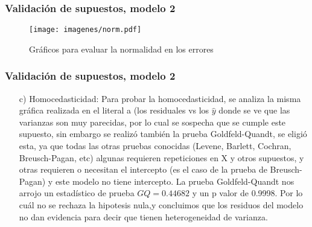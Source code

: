 \documentclass[12pt]{beamer}
\begin{document}
\begin{frame}
\frametitle{Validación de supuestos, modelo 2}
\begin{figure}[h]
  \centering
  \texttt{[image: imagenes/norm.pdf]}
  \caption{Gráficos para evaluar la normalidad en los errores}\label{figura1}
\end{figure}
\end{frame}

\begin{frame}
\frametitle{Validación de supuestos, modelo 2}
\begin{itemize}
\item[c)] Homocedasticidad: Para probar la homocedasticidad, se analiza la misma gráfica realizada en el literal a (los residuales vs los $\hat{y}$ donde se ve que las varianzas son muy parecidas, por lo cual se sospecha que se cumple este supuesto, sin embargo se realizó también la prueba Goldfeld-Quandt, se eligió esta, ya que todas las otras pruebas conocidas (Levene, Barlett, Cochran, Breusch-Pagan, etc) algunas requieren repeticiones en X y otros supuestos, y otras requieren o necesitan el intercepto (es el caso de la prueba de Breusch-Pagan) y este modelo no tiene intercepto. La prueba Goldfeld-Quandt nos arrojo un estadístico de prueba $GQ = 0.44682$ y un p valor de 0.9998. Por lo cuál no se rechaza la hipotesis nula,y concluimos que los residuos del modelo no dan evidencia para decir que tienen heterogeneidad de varianza.
\end{itemize}
\end{frame}
\end{document}
